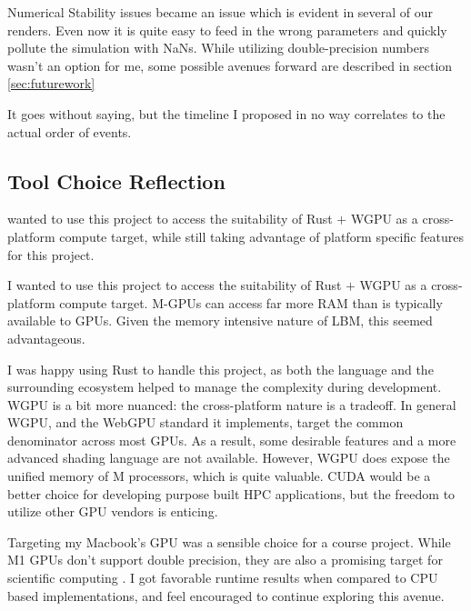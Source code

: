 Numerical Stability issues became an issue which
is evident in several of our renders.
Even now it is quite easy to feed in the wrong parameters
and quickly pollute the simulation with NaNs.
While utilizing double-precision numbers wasn't an option for me,
some possible avenues forward are described 
in section \ref{sec:futurework}

It goes without saying, 
but the timeline I proposed 
in no way correlates to the actual order of events.

\subsection{Tool Choice Reflection}
 wanted to use this project to access the suitability of Rust $+$ WGPU 
as a cross-platform compute target, 
while still taking advantage of platform specific features 
for this project.




I wanted to use this project to access the suitability of Rust $+$ WGPU 
as a cross-platform compute target.
M-GPUs can access far more RAM than is typically available to GPUs.
Given the memory intensive nature of LBM, this seemed advantageous.

I was happy using Rust to handle this project, as both the 
language and the surrounding ecosystem helped to manage
the complexity during development.
WGPU is a bit more nuanced: the cross-platform nature
is a tradeoff. In general WGPU, 
and the WebGPU standard it implements,
target the common denominator across most GPUs.
As a result, some desirable features and a more advanced
shading language are not available.
However, WGPU does expose the unified memory of M processors,
which is quite valuable.
CUDA would be a better choice 
for developing purpose built HPC
applications, but the freedom to utilize other GPU vendors is enticing.

Targeting my Macbook's GPU was a sensible choice for a course project.
While M1 GPUs don't support double precision, 
they are also a promising target for scientific computing \cite{Kenyon2022}.
I got favorable runtime results when compared to CPU based implementations,
and feel encouraged to continue exploring this avenue.
